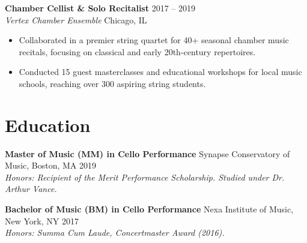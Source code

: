 \documentclass[10pt,letterpaper]{article}
\begin{document}
\vspace{0.4em}

\textbf{Chamber Cellist \& Solo Recitalist} \hfill 2017 -- 2019 \\
\textit{Vertex Chamber Ensemble} \hfill Chicago, IL
\begin{itemize}[leftmargin=1.2em, nosep, topsep=1pt]
    \item Collaborated in a premier string quartet for 40+ seasonal chamber music recitals, focusing on classical and early 20th-century repertoires.
    \item Conducted 15 guest masterclasses and educational workshops for local music schools, reaching over 300 aspiring string students.
\end{itemize}

\section*{Education}

\textbf{Master of Music (MM) in Cello Performance} \hfill Synapse Conservatory of Music, Boston, MA \hfill 2019 \\
\textit{Honors: Recipient of the Merit Performance Scholarship. Studied under Dr. Arthur Vance.}

\vspace{0.3em}

\textbf{Bachelor of Music (BM) in Cello Performance} \hfill Nexa Institute of Music, New York, NY \hfill 2017 \\
\textit{Honors: Summa Cum Laude, Concertmaster Award (2016).}
\end{document}
